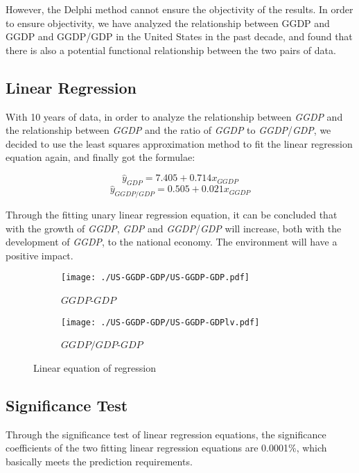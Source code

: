 \documentclass[12pt]{article}
\begin{document}
	However, the Delphi method cannot ensure the objectivity of the results.
	In order to ensure objectivity, we have analyzed the relationship between GGDP and GGDP and GGDP/GDP in the United States in the past decade, and found that there is also a potential functional relationship between the two pairs of data.
	
	\subsection{Linear Regression} %
	With 10 years of data, in order to analyze the relationship between \textit{GGDP} and the relationship between \textit{GGDP} and the ratio of \textit{GGDP} to \textit{GGDP}/\textit{GDP}, we decided to use the least squares approximation method to fit the linear regression equation again, and finally got the formulae:
	
	\begin{equation}\label{eq:GDP}
		\hat{y}_{GDP} =7.405 + 0.714x_{GGDP}
	\end{equation}
	\begin{equation}\label{GGDP/GDP}
		\hat{y}_{GGDP/GDP} =0.505 + 0.021x_{GGDP}
	\end{equation}
	
	Through the fitting unary linear regression equation, it can be concluded that with the growth of \textit{GGDP}, \textit{GDP} and \textit{GGDP}/\textit{GDP} will increase, both with the development of \textit{GGDP}, to the national economy. The environment will have a positive impact.
	
	\begin{figure}[htbp]
		\centering
		\begin{subfigure}[b]{.4\textwidth}
			\texttt{[image: ./US-GGDP-GDP/US-GGDP-GDP.pdf]}
			\caption{$GGDP$-$GDP$}\label{}
		\end{subfigure}
		\begin{subfigure}[b]{.4\textwidth}
			\texttt{[image: ./US-GGDP-GDP/US-GGDP-GDPlv.pdf]}
			\caption{$GGDP / GDP$-$GDP$}\label{}
		\end{subfigure}
		\caption{Linear equation of regression}\label{}
	\end{figure}
	
	\subsection{Significance Test} %
	Through the significance test of linear regression equations, the significance coefficients of the two fitting linear regression equations are 0.0001\%, which basically meets the prediction requirements.
	
\end{document}
